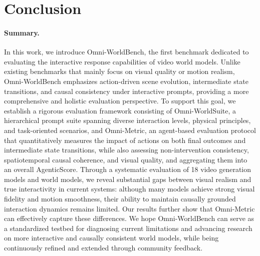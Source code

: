 \section{Conclusion}
\label{sec:concl}


\paragraph{Summary.} In this work, we introduce Omni-WorldBench, the first benchmark dedicated to evaluating the interactive response capabilities of video world models. Unlike existing benchmarks that mainly focus on visual quality or motion realism, Omni-WorldBench emphasizes action-driven scene evolution, intermediate state transitions, and causal consistency under interactive prompts, providing a more comprehensive and holistic evaluation perspective. To support this goal, we establish a rigorous evaluation framework consisting of Omni-WorldSuite, a hierarchical prompt suite spanning diverse interaction levels, physical principles, and task-oriented scenarios, and Omni-Metric, an agent-based evaluation protocol that quantitatively measures the impact of actions on both final outcomes and intermediate state transitions, while also assessing non-intervention consistency, spatiotemporal causal coherence, and visual quality, and aggregating them into an overall AgenticScore. Through a systematic evaluation of 18 video generation models and world models, we reveal substantial gaps between visual realism and true interactivity in current systems: although many models achieve strong visual fidelity and motion smoothness, their ability to maintain causally grounded interaction dynamics remains limited. Our results further show that Omni-Metric can effectively capture these differences. We hope Omni-WorldBench can serve as a standardized testbed for diagnosing current limitations and advancing research on more interactive and causally consistent world models, while being continuously refined and extended through community feedback.


